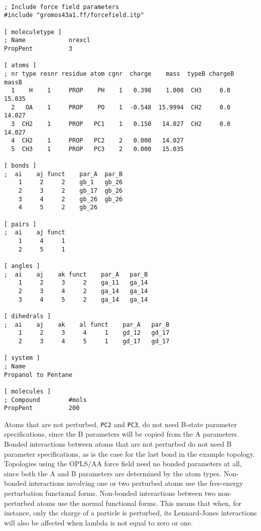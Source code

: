 {\small
\begin{verbatim}
 
; Include force field parameters
#include "gromos43a1.ff/forcefield.itp"

[ moleculetype ]
; Name            nrexcl
PropPent          3

[ atoms ]
; nr type resnr residue atom cgnr  charge    mass  typeB chargeB  massB
  1    H    1     PROP    PH    1   0.398    1.008  CH3     0.0  15.035
  2   OA    1     PROP    PO    1  -0.548  15.9994  CH2     0.0  14.027
  3  CH2    1     PROP   PC1    1   0.150   14.027  CH2     0.0  14.027
  4  CH2    1     PROP   PC2    2   0.000   14.027
  5  CH3    1     PROP   PC3    2   0.000   15.035

[ bonds ]
;  ai    aj funct    par_A  par_B 
    1     2     2    gb_1   gb_26
    2     3     2    gb_17  gb_26
    3     4     2    gb_26  gb_26
    4     5     2    gb_26

[ pairs ]
;  ai    aj funct
    1     4     1
    2     5     1

[ angles ]
;  ai    aj    ak funct    par_A   par_B
    1     2     3     2    ga_11   ga_14
    2     3     4     2    ga_14   ga_14
    3     4     5     2    ga_14   ga_14

[ dihedrals ]
;  ai    aj    ak    al funct    par_A   par_B
    1     2     3     4     1    gd_12   gd_17
    2     3     4     5     1    gd_17   gd_17

[ system ]
; Name
Propanol to Pentane

[ molecules ]
; Compound        #mols
PropPent          200
\end{verbatim}}

Atoms that are not perturbed, {\tt PC2} and {\tt PC3}, do not need B-state parameter
specifications, since the B parameters will be copied from the A parameters.
Bonded interactions between atoms that are not perturbed do not need B
parameter specifications, as is the case for the last bond in the example topology.
Topologies using the OPLS/AA force field need no bonded parameters at all,
since both the A and B parameters are determined by the atom types.
Non-bonded interactions involving one or two perturbed atoms use the 
free-energy perturbation functional forms.
Non-bonded interactions between two non-perturbed atoms use the normal
functional forms.
This means that when, for instance, only the charge of a particle is
perturbed, its Lennard-Jones interactions will also be affected when
lambda is not equal to zero or one.

